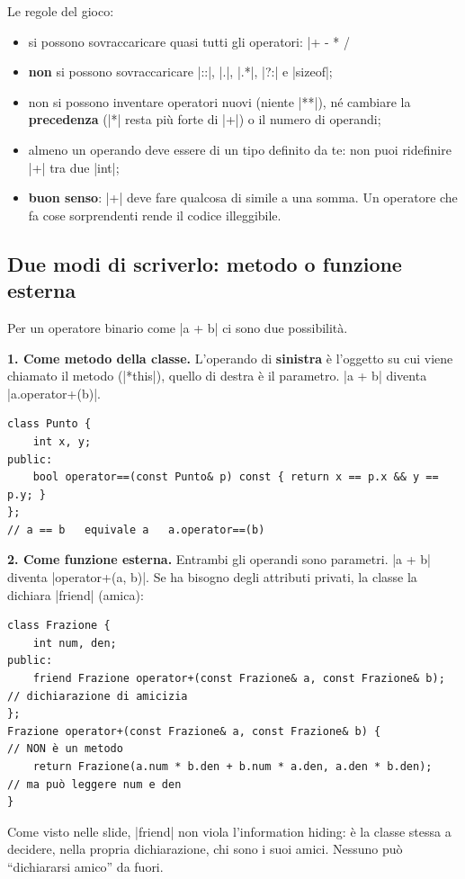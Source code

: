 Le regole del gioco:
\begin{itemize}
  \item si possono sovraccaricare quasi tutti gli operatori:
        \cc|+ - * / %
  \item \textbf{non} si possono sovraccaricare \cc|::|, \cc|.|, \cc|.*|, \cc|?:| e
        \cc|sizeof|;
  \item non si possono inventare operatori nuovi (niente \cc|**|), né cambiare la
        \textbf{precedenza} (\cc|*| resta più forte di \cc|+|) o il numero di operandi;
  \item almeno un operando deve essere di un tipo definito da te: non puoi ridefinire
        \cc|+| tra due \cc|int|;
  \item \textbf{buon senso}: \cc|+| deve fare qualcosa di simile a una somma. Un
        operatore che fa cose sorprendenti rende il codice illeggibile.
\end{itemize}

\subsection*{Due modi di scriverlo: metodo o funzione esterna}

Per un operatore binario come \cc|a + b| ci sono due possibilità.

\textbf{1. Come metodo della classe.} L'operando di \textbf{sinistra} è l'oggetto su
cui viene chiamato il metodo (\cc|*this|), quello di destra è il parametro.
\cc|a + b| diventa \cc|a.operator+(b)|.
\begin{lstlisting}
class Punto {
    int x, y;
public:
    bool operator==(const Punto& p) const { return x == p.x && y == p.y; }
};
// a == b   equivale a   a.operator==(b)
\end{lstlisting}

\textbf{2. Come funzione esterna.} Entrambi gli operandi sono parametri. \cc|a + b|
diventa \cc|operator+(a, b)|. Se ha bisogno degli attributi privati, la classe la
dichiara \cc|friend| (amica):
\begin{lstlisting}
class Frazione {
    int num, den;
public:
    friend Frazione operator+(const Frazione& a, const Frazione& b);  // dichiarazione di amicizia
};
Frazione operator+(const Frazione& a, const Frazione& b) {           // NON è un metodo
    return Frazione(a.num * b.den + b.num * a.den, a.den * b.den);   // ma può leggere num e den
}
\end{lstlisting}
Come visto nelle slide, \cc|friend| non viola l'information hiding: è la classe stessa
a decidere, nella propria dichiarazione, chi sono i suoi amici. Nessuno può
``dichiararsi amico'' da fuori.

